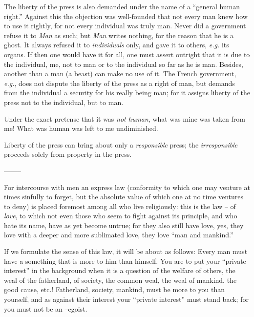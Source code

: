 \documentclass[12pt,a4paper]{book}
\begin{document}
The liberty of the press is also demanded under the name of a ``general human 
right.'' Against this the objection was well-founded that not every man knew 
how to use it rightly, for not every individual was truly man. Never did a 
government refuse it to \textit{Man} as such; but \textit{Man} writes nothing, 
for the reason that he is a ghost. It always refused it to 
\textit{individuals} only, and gave it to others, \textit{e.g.} its organs. 
If then one would have it for all, one must assert outright that it is due to 
the individual, me, not to man or to the individual so far as he is man. 
Besides, another than a man (a beast) can make no use of it. The French 
government, \textit{e.g.}, does not dispute the liberty of the press as a 
right of man, but demands from the individual a security for his really being 
man; for it assigns liberty of the press not to the individual, but to man.

Under the exact pretense that it was \textit{not human}, what was mine was 
taken from me! What was human was left to me undiminished.

Liberty of the press can bring about only a \textit{responsible} press; the 
\textit{irresponsible} proceeds solely from property in the press.

\begin{center}
--------\end{center}


For intercourse with men an express law (conformity to which one may venture 
at times sinfully to forget, but the absolute value of which one at no time 
ventures to deny) is placed foremost among all who live religiously: this is 
the law -- of \textit{love}, to which not even those who seem to fight against 
its principle, and who hate its name, have as yet become untrue; for they also 
still have love, yes, they love with a deeper and more sublimated love, they 
love ``man and mankind.''

If we formulate the sense of this law, it will be about as follows: Every man 
must have a something that is more to him than himself. You are to put your 
``private interest'' in the background when it is a question of the welfare 
of others, the weal of the fatherland, of society, the common weal, the weal 
of mankind, the good cause, etc.! Fatherland, society, mankind, must be more 
to you than yourself, and as against their interest your ``private 
interest'' must stand back; for you must not be an --egoist.
\end{document}
